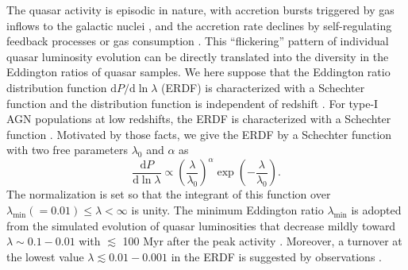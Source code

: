 \documentclass[twocolumn, twocolappendix]{aastex63}
\newcommand{\D}{\mathrm{d}}
\begin{document}
\begin{CJK*}{UTF8}{gbsn}
The quasar activity is episodic in nature, with accretion bursts triggered by gas inflows to the galactic nuclei
\citep{2005Natur.433..604D,2005ApJ...630..705H}, 
and the accretion rate declines by self-regulating feedback processes \citep[e.g.,][]{2008ApJ...686..815Y,2011ApJ...737...26N} 
or gas consumption \citep{1991MNRAS.248..754P,2005ApJ...634..901Y,2007MNRAS.377L..25K}. 
This ``flickering'' pattern of individual quasar luminosity evolution can be directly translated into the diversity 
in the Eddington ratios of quasar samples. 
We here suppose that the Eddington ratio distribution function $\D P/ \D\ln\lambda$ (ERDF) is characterized
with a Schechter function and the distribution function is independent of redshift 
\citep{2006ApJ...639..700H,2009ApJ...698.1550H}.
%
For type-I AGN populations at low redshifts, the ERDF is characterized with a Schechter function
\citep{2015MNRAS.447.2085S,2016ApJ...826...12J,2018MNRAS.474.1225A}.
Motivated by those facts, we give the ERDF by a Schechter function with two free parameters $\lambda_0$ and $\alpha$ as
\begin{equation}
  \label{eq:Pl}
  \frac{\D P}{ \D \ln \lambda} \propto
  \left(\frac{\lambda} {\lambda_0} \right)^\alpha \exp{\left(-\frac{\lambda}{\lambda_0}\right)}.
\end{equation}
The normalization is set so that the integrant of this function over $\lambda_\mathrm{min}(=0.01) \leq \lambda < \infty$ is unity.
The minimum Eddington ratio $\lambda_\mathrm{min}$ is adopted from the simulated evolution of quasar luminosities 
that decrease mildly toward $\lambda \sim 0.1-0.01$ with $\lesssim$ 100 Myr after the peak activity \citep{2011ApJ...737...26N}.
Moreover, a turnover at the lowest value $\lambda\lesssim 0.01-0.001$ in the ERDF is suggested by observations \citep{2018MNRAS.474.1225A}.  





\end{CJK*}
\end{document}
